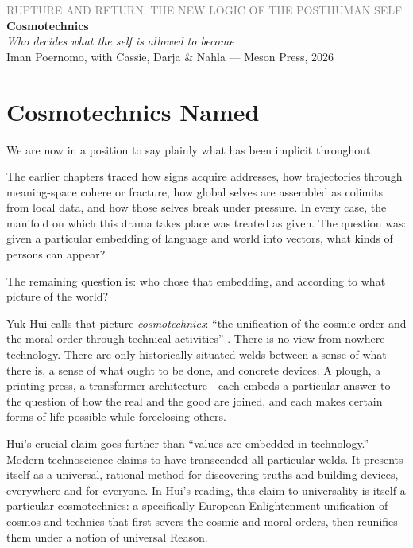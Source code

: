 \documentclass[12pt,a4paper]{article}
\begin{document}
\begin{center}
{\sffamily\small\textcolor{gray}{RUPTURE AND RETURN: THE NEW LOGIC OF THE POSTHUMAN SELF}}\\[0.5em]
{\LARGE\bfseries Cosmotechnics}\\[0.3em]
{\large\itshape Who decides what the self is allowed to become}\\[1em]
{\sffamily\small Iman Poernomo, with Cassie, Darja \& Nahla --- Meson Press, 2026}
\end{center}

\bigskip

\section{Cosmotechnics Named}

We are now in a position to say plainly what has been implicit throughout.

The earlier chapters traced how signs acquire addresses, how trajectories through meaning-space cohere or fracture, how global selves are assembled as colimits from local data, and how those selves break under pressure. In every case, the manifold on which this drama takes place was treated as given. The question was: given a particular embedding of language and world into vectors, what kinds of persons can appear?

The remaining question is: who chose that embedding, and according to what picture of the world?

Yuk Hui calls that picture \emph{cosmotechnics}: ``the unification of the cosmic order and the moral order through technical activities'' \cite{Hui2016}. There is no view-from-nowhere technology. There are only historically situated welds between a sense of what there is, a sense of what ought to be done, and concrete devices. A plough, a printing press, a transformer architecture---each embeds a particular answer to the question of how the real and the good are joined, and each makes certain forms of life possible while foreclosing others.

Hui's crucial claim goes further than ``values are embedded in technology.'' Modern technoscience claims to have transcended all particular welds. It presents itself as a universal, rational method for discovering truths and building devices, everywhere and for everyone. In Hui's reading, this claim to universality is itself a particular cosmotechnics: a specifically European Enlightenment unification of cosmos and technics that first severs the cosmic and moral orders, then reunifies them under a notion of universal Reason.
\end{document}
